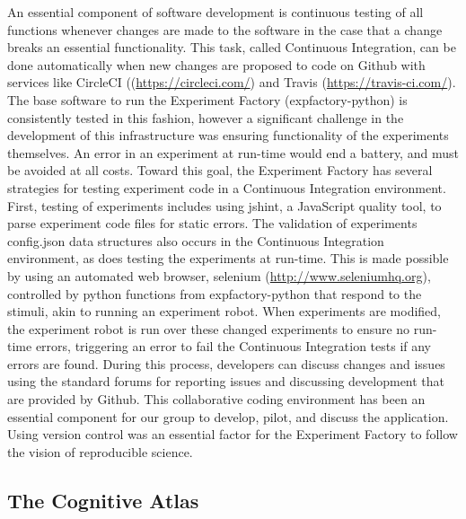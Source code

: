 \documentclass{report}
\begin{document}
An essential component of software development is continuous testing of
all functions whenever changes are made to the software in the case that
a change breaks an essential functionality. This task, called Continuous
Integration, can be done automatically when new changes are proposed to
code on Github with services like CircleCI ((\href{https://circleci.com/}{https://circleci.com/}) and
Travis (\href{https://travis-ci.com/}{https://travis-ci.com/}). 
The base software to run the Experiment Factory (expfactory-python) is consistently tested in this fashion, however a significant challenge in the development of this
infrastructure was ensuring functionality of the experiments themselves.
An error in an experiment at run-time would end a battery, and must be
avoided at all costs. Toward this goal, the Experiment Factory has
several strategies for testing experiment code in a Continuous
Integration environment. First, testing of experiments includes using
jshint, a JavaScript quality tool, to parse experiment code files for
static errors. The validation of experiments config.json data structures
also occurs in the Continuous Integration environment, as does testing
the experiments at run-time. This is made possible by using an automated
web browser, selenium (\href{http://www.seleniumhq.org}{http://www.seleniumhq.org}), controlled by python functions from expfactory-python that respond to the stimuli, akin to
running an experiment robot. When experiments are modified, the
experiment robot is run over these changed experiments to ensure no
run-time errors, triggering an error to fail the Continuous Integration
tests if any errors are found. During this process, developers can
discuss changes and issues using the standard forums for reporting
issues and discussing development that are provided by Github. This
collaborative coding environment has been an essential component for our
group to develop, pilot, and discuss the application. Using version
control was an essential factor for the Experiment Factory to follow the
vision of reproducible science.

\subsection{The Cognitive Atlas}
\end{document}

